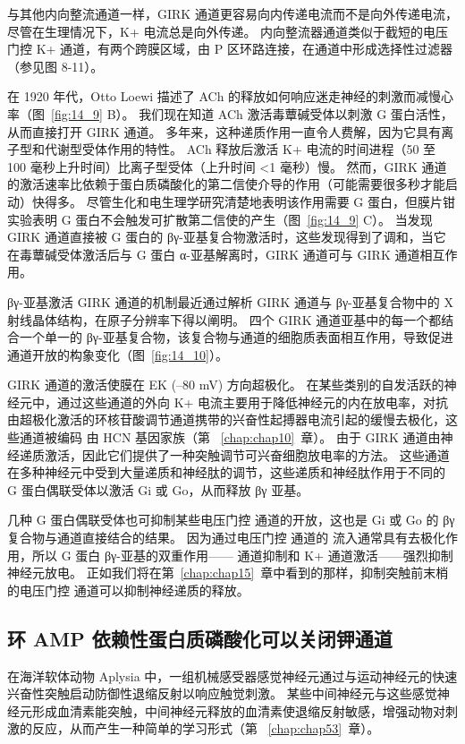 与其他内向整流通道一样，GIRK 通道更容易向内传递电流而不是向外传递电流，尽管在生理情况下，K+ 电流总是向外传递。
内向整流器通道类似于截短的电压门控 K+ 通道，有两个跨膜区域，由 P 区环路连接，在通道中形成选择性过滤器（参见图 8-11）。


在 1920 年代，Otto Loewi 描述了 ACh 的释放如何响应迷走神经的刺激而减慢心率（图~\ref{fig:14_9} B）。
我们现在知道 ACh 激活毒蕈碱受体以刺激 G 蛋白活性，从而直接打开 GIRK 通道。
多年来，这种递质作用一直令人费解，因为它具有离子型和代谢型受体作用的特性。
ACh 释放后激活 K+ 电流的时间进程（50 至 100 毫秒上升时间）比离子型受体（上升时间 <1 毫秒）慢。
然而，GIRK 通道的激活速率比依赖于蛋白质磷酸化的第二信使介导的作用（可能需要很多秒才能启动）快得多。 
尽管生化和电生理学研究清楚地表明该作用需要 G 蛋白，但膜片钳实验表明 G 蛋白不会触发可扩散第二信使的产生（图~\ref{fig:14_9} C）。
当发现 GIRK 通道直接被 G 蛋白的 βγ-亚基复合物激活时，这些发现得到了调和，当它在毒蕈碱受体激活后与 G 蛋白 α-亚基解离时，GIRK 通道可与 GIRK 通道相互作用。


βγ-亚基激活 GIRK 通道的机制最近通过解析 GIRK 通道与 βγ-亚基复合物中的 X 射线晶体结构，在原子分辨率下得以阐明。
四个 GIRK 通道亚基中的每一个都结合一个单一的 βγ-亚基复合物，该复合物与通道的细胞质表面相互作用，导致促进通道开放的构象变化（图~\ref{fig:14_10}）。


GIRK 通道的激活使膜在 EK (–80 mV) 方向超极化。 
在某些类别的自发活跃的神经元中，通过这些通道的外向 K+ 电流主要用于降低神经元的内在放电率，对抗由超极化激活的环核苷酸调节通道携带的兴奋性起搏器电流引起的缓慢去极化，这些通道被编码 由 HCN 基因家族（第 ~\ref{chap:chap10}~章）。
由于 GIRK 通道由神经递质激活，因此它们提供了一种突触调节可兴奋细胞放电率的方法。
这些通道在多种神经元中受到大量递质和神经肽的调节，这些递质和神经肽作用于不同的 G 蛋白偶联受体以激活 Gi 或 Go，从而释放 βγ 亚基。


几种 G 蛋白偶联受体也可抑制某些电压门控  通道的开放，这也是 Gi 或 Go 的 βγ 复合物与通道直接结合的结果。
因为通过电压门控  通道的  流入通常具有去极化作用，所以 G 蛋白 βγ-亚基的双重作用—— 通道抑制和 K+ 通道激活——强烈抑制神经元放电。
正如我们将在第~\ref{chap:chap15}~章中看到的那样，抑制突触前末梢的电压门控  通道可以抑制神经递质的释放。



\subsection{环 AMP 依赖性蛋白质磷酸化可以关闭钾通道}

在海洋软体动物 Aplysia 中，一组机械感受器感觉神经元通过与运动神经元的快速兴奋性突触启动防御性退缩反射以响应触觉刺激。
某些中间神经元与这些感觉神经元形成血清素能突触，中间神经元释放的血清素使退缩反射敏感，增强动物对刺激的反应，从而产生一种简单的学习形式（第 ~\ref{chap:chap53}~章）。


